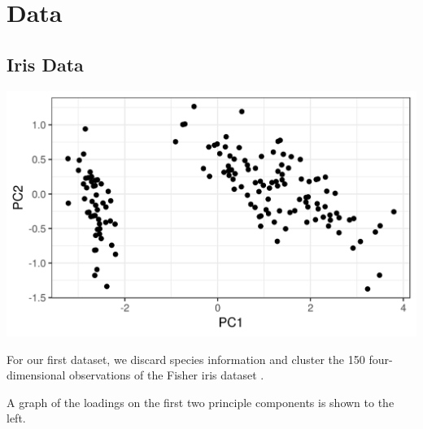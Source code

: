\documentclass[a0,plainsections,30pt]{sciposter}\usepackage[]{graphicx}\usepackage[]{color}
\newenvironment{knitrout}{}{} %
\begin{document}
\hfill \vrule \hfill
\begin{minipage}[t]{0.45\textwidth}




\section*{Data}


\begin{minipage}[t]{0.49\textwidth}
\subsection*{Iris Data}


\begin{knitrout}
\color{fgcolor}

{\centering \includegraphics[width=0.98\linewidth,height=0.588\linewidth]{figure/iris_pca-1} 

}



\end{knitrout}
\end{minipage}
%
\begin{minipage}[t]{0.49\textwidth}
%
For our first dataset, we discard species
information and cluster the 150 four-dimensional observations of the Fisher iris
dataset \citep{iris_data_anderson}.

A graph of the loadings on the first two principle components is shown
to the left.
%
\end{minipage}



\end{minipage}
\end{document}
